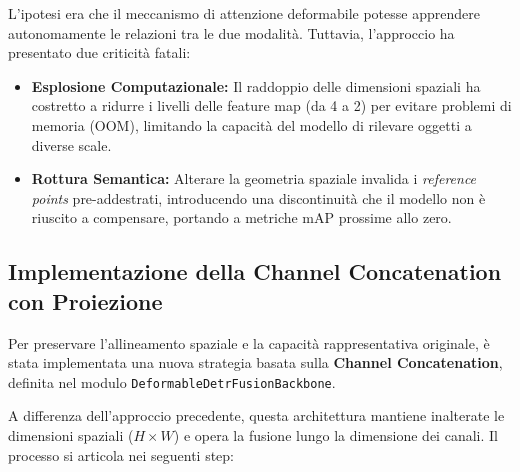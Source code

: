 \documentclass[a4paper,11pt]{article}
\begin{document}
L'ipotesi era che il meccanismo di attenzione deformabile potesse apprendere autonomamente le relazioni tra le due modalità. Tuttavia, l'approccio ha presentato due criticità fatali:
\begin{itemize}
    \item \textbf{Esplosione Computazionale:} Il raddoppio delle dimensioni spaziali ha costretto a ridurre i livelli delle feature map (da 4 a 2) per evitare problemi di memoria (OOM), limitando la capacità del modello di rilevare oggetti a diverse scale.
    \item \textbf{Rottura Semantica:} Alterare la geometria spaziale invalida i \textit{reference points} pre-addestrati, introducendo una discontinuità che il modello non è riuscito a compensare, portando a metriche mAP prossime allo zero.
\end{itemize}

\subsection{Implementazione della Channel Concatenation con Proiezione}
Per preservare l'allineamento spaziale e la capacità rappresentativa originale, è stata implementata una nuova strategia basata sulla \textbf{Channel Concatenation}, definita nel modulo \newline \texttt{DeformableDetrFusionBackbone}.

A differenza dell'approccio precedente, questa architettura mantiene inalterate le dimensioni spaziali ($H \times W$) e opera la fusione lungo la dimensione dei canali. Il processo si articola nei seguenti step:
\end{document}

